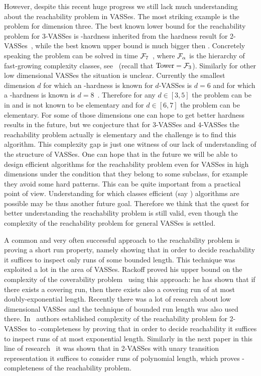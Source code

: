 However, despite this recent huge progress we still lack much understanding about the
reachability problem in VASSes. The most striking example is the problem for dimension three.
The best known lower bound for the reachability problem for 3-VASSes
is \pspace-hardness inherited from the hardness result for 2-VASSes~\cite{DBLP:conf/lics/BlondinFGHM15},
while the best known upper bound is much bigger then \tower. Concretely speaking the problem
can be solved in time $\mathcal{F}_7$~\cite{DBLP:conf/lics/LerouxS19}, where $\mathcal{F}_\alpha$ is the hierarchy
of fast-growing complexity classes, see~\cite{DBLP:journals/toct/Schmitz16} (recall that $\textup{Tower} = \mathcal{F}_3$).
Similarly for other low dimensional VASSes the situation is unclear.
Currently the smallest dimension $d$ for which an \expspace-hardness
is known for $d$-VASSes is $d = 6$ and for which a \tower-hardness is known is $d = 8$~\cite{DBLP:journals/corr/abs-2203-04243}.
Therefore for any $d \in [3,5]$ the problem can be in \pspace and is not known to be elementary
and for $d \in [6,7]$ the problem can be elementary.
For some of those dimensions one can hope to get better hardness results in the future,
but we conjecture that for $3$-VASSes and $4$-VASSes the reachability problem actually is elementary
and the challenge is to find this algorithm.
This complexity gap is just one witness of our lack of understanding of the structure of VASSes.
One can hope that in the future we will be able to design efficient algorithms for the reachability problem
even for VASSes in high dimensions under the condition that they belong to some subclass, for example
they avoid some hard patterns. This can be quite important from a practical point of view. Understanding
for which classes efficient (say \pspace) algorithms are possible may be thus another future goal.
Therefore we think that the quest for better understanding the reachability problem is still valid,
even though the complexity of the reachability problem for general VASSes is settled.

A common and very often successful approach to the reachability problem is proving a short run property,
namely showing that in order to decide reachability it suffices to inspect only runs of some bounded length.
This technique was exploited a lot in the area of VASSes.
Rackoff proved his \expspace upper bound on the complexity of the coverability problem~\cite{DBLP:journals/tcs/Rackoff78}
using this approach: he has shown that if there exists a covering run, then there exists also a covering run
of at most doubly-exponential length.
Recently there was a lot of research about low dimensional VASSes and the technique of bounded run length was also
used there. In~\cite{DBLP:conf/lics/BlondinFGHM15} authors established complexity of the reachability problem
for 2-VASSes to \pspace-completeness by proving that in order to decide reachability it suffices to inspect runs
of at most exponential length. Similarly in the next paper in this line of research~\cite{DBLP:conf/lics/EnglertLT16}
it was shown that in 2-VASSes with unary transition representation it suffices to consider runs of polynomial length,
which proves \nl-completeness of the reachability problem.

